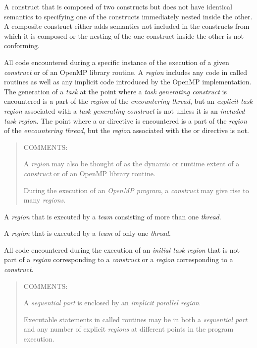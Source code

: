 \glossarydefstart 
A construct that is composed of two constructs but does not have identical semantics to specifying one of the constructs immediately nested inside the other. A composite construct either adds semantics not included in the constructs from which it is composed or the nesting of the one construct inside the other is not conforming.
\glossarydefend


\glossarydefstart
All code encountered during a specific instance of the execution of a given 
\emph{construct} or of an OpenMP library routine. A \emph{region} includes any code in called 
routines as well as any implicit code introduced by the OpenMP implementation. 
The generation of a \emph{task} at the point where a \emph{task generating construct} is encountered is a 
part of the \emph{region} of the \emph{encountering thread}, but an \emph{explicit task region}
associated with a \emph{task generating construct} is not unless it is an
\emph{included task region}. The point where a  or 
directive is encountered is a part of the \emph{region} of the \emph{encountering thread}, but the 
\emph{region} associated with the  or  directive is not.

\begin{quote}
COMMENTS:

A \emph{region} may also be thought of as the dynamic or runtime extent of a 
\emph{construct} or of an OpenMP library routine.

During the execution of an \emph{OpenMP program}, a \emph{construct} may give 
rise to many \emph{regions}.
\end{quote}
\glossarydefend

\glossarydefstart
A  \emph{region} that is executed by a \emph{team} consisting of more than one 
\emph{thread}.
\glossarydefend

\smallskip
{}
\glossarydefstart
A  \emph{region} that is executed by a \emph{team} of only one \emph{thread}.
\glossarydefend

\glossarydefstart
All code encountered during the execution of an \emph{initial task region} that is not part 
of a  \emph{region} corresponding to a  \emph{construct} or a 
\emph{region} corresponding to a  \emph{construct}.

\begin{quote}
COMMENTS: 

A \emph{sequential part} is enclosed by an \emph{implicit parallel region}.

Executable statements in called routines may be in both a \emph{sequential 
part} and any number of explicit  \emph{regions} at different points 
in the program execution.
\end{quote}
\glossarydefend

